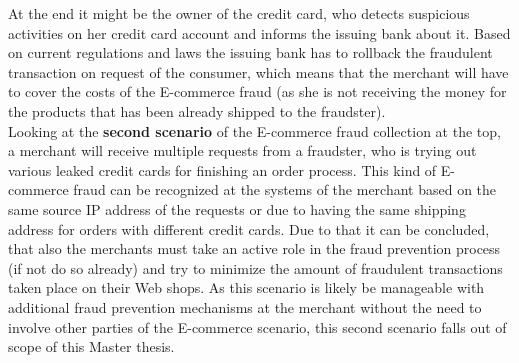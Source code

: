 At the end it might be the owner of the credit card, who detects suspicious activities on her credit card account and informs the issuing bank about it. Based on current regulations and laws the issuing bank has to rollback the fraudulent transaction on request of the consumer, which means that the merchant will have to cover the costs of the E-commerce fraud (as she is not receiving the money for the products that has been already shipped to the fraudster). \\

Looking at the \textbf{second scenario} of the E-commerce fraud collection at the top, a merchant will receive multiple requests from a fraudster, who is trying out various leaked credit cards for finishing an order process. This kind of E-commerce fraud can be recognized at the systems of the merchant based on the same source \gls{IP} address of the requests or due to having the same shipping address for orders with different credit cards. Due to that it can be concluded, that also the merchants must take an active role in the fraud prevention process (if not do so already) and try to minimize the amount of fraudulent transactions taken place on their Web shops. As this scenario is likely be manageable with additional fraud prevention mechanisms at the merchant without the need to involve other parties of the E-commerce scenario, this second scenario falls out of scope of this Master thesis.

